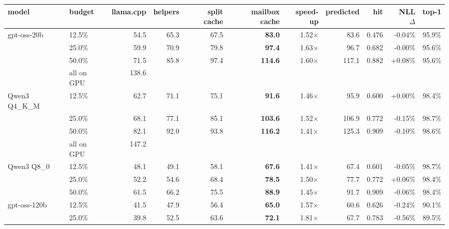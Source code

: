 \begin{tabular}{llrrrrrrrrr}\toprule
model & budget & llama.cpp & helpers & split cache & mailbox cache & speed-up & predicted & hit & NLL $\Delta$ & top-1\\\midrule
gpt-oss-20b & 12.5\% & 54.5 & 65.3 & 67.5 & \textbf{83.0} & 1.52$\times$ & 83.6 & 0.476 & -0.04\% & 95.9\%\\
 & 25.0\% & 59.9 & 70.9 & 79.8 & \textbf{97.4} & 1.63$\times$ & 96.7 & 0.682 & -0.00\% & 95.6\%\\
 & 50.0\% & 71.5 & 85.8 & 97.4 & \textbf{114.6} & 1.60$\times$ & 117.1 & 0.882 & +0.08\% & 95.6\%\\
 & all on GPU & 138.6 & & & & & & & & \\
\midrule
Qwen3 Q4\_K\_M & 12.5\% & 62.7 & 71.1 & 75.1 & \textbf{91.6} & 1.46$\times$ & 95.9 & 0.600 & +0.00\% & 98.4\%\\
 & 25.0\% & 68.1 & 77.1 & 85.1 & \textbf{103.6} & 1.52$\times$ & 106.9 & 0.772 & -0.15\% & 98.7\%\\
 & 50.0\% & 82.1 & 92.0 & 93.8 & \textbf{116.2} & 1.41$\times$ & 125.3 & 0.909 & -0.10\% & 98.6\%\\
 & all on GPU & 147.2 & & & & & & & & \\
\midrule
Qwen3 Q8\_0 & 12.5\% & 48.1 & 49.1 & 58.1 & \textbf{67.6} & 1.41$\times$ & 67.4 & 0.601 & -0.05\% & 98.7\%\\
 & 25.0\% & 52.2 & 54.6 & 68.4 & \textbf{78.5} & 1.50$\times$ & 77.7 & 0.772 & +0.06\% & 98.4\%\\
 & 50.0\% & 61.5 & 66.2 & 75.5 & \textbf{88.9} & 1.45$\times$ & 91.7 & 0.909 & -0.06\% & 98.4\%\\
\midrule
gpt-oss-120b & 12.5\% & 41.5 & 47.9 & 56.4 & \textbf{65.0} & 1.57$\times$ & 60.6 & 0.626 & -0.24\% & 90.1\%\\
 & 25.0\% & 39.8 & 52.5 & 63.6 & \textbf{72.1} & 1.81$\times$ & 67.7 & 0.783 & -0.56\% & 89.5\%\\
\bottomrule
\end{tabular}
